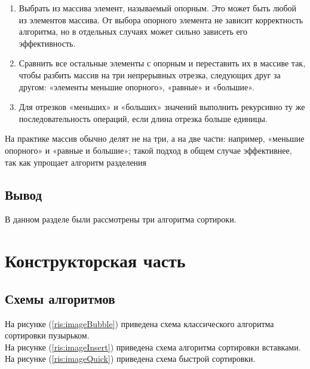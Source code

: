 \documentclass[12pt]{report}
\begin{document}
\begin{enumerate}
  	\item Выбрать из массива элемент, называемый опорным. Это может быть любой из элементов массива. От выбора опорного элемента не зависит корректность алгоритма, но в отдельных случаях может сильно зависеть его эффективность.
	\item Сравнить все остальные элементы с опорным и переставить их в массиве так, чтобы разбить массив на три непрерывных отрезка, следующих друг за другом: «элементы меньшие опорного», «равные» и «большие».
	\item Для отрезков «меньших» и «больших» значений выполнить рекурсивно ту же последовательность операций, если длина отрезка больше единицы.
\end{enumerate}
На практике массив обычно делят не на три, а на две части: например, «меньшие опорного» и «равные и большие»; такой подход в общем случае эффективнее, так как упрощает алгоритм разделения

\section{Вывод}
В данном разделе были рассмотрены три алгоритма сортироки.

\chapter{Конструкторская часть}
\section{Схемы алгоритмов}

На рисунке (\ref{ris:imageBubble}) приведена схема классического алгоритма сортировки пузырьком.\\
На рисунке (\ref{ris:imageInsert}) приведена схема алгоритма сортировки вставками.\\
На рисунке (\ref{ris:imageQuick}) приведена схема быстрой сортировки.
\end{document}

